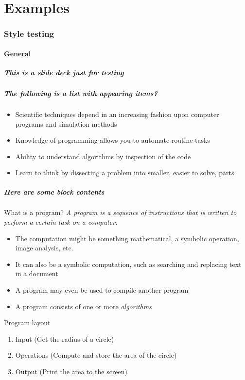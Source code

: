 \part{Examples}
\section{Style testing}
\subsection*{General}
\begin{frame}[label=contents_sample]
  \frametitle{This is a slide deck just for testing}
\end{frame}

\begin{frame}
 \frametitle{The following is a list with appearing items?}
 \begin{itemize}[<+->]
  \item Scientific techniques depend in an increasing fashion upon computer programs and simulation methods
  \item Knowledge of programming allows you to automate routine tasks 
  \item Ability to understand algorithms by inspection of the code 
  \item Learn to think by dissecting a problem into smaller, easier to solve, parts 
 \end{itemize}
\end{frame}

\begin{frame}
 \frametitle{Here are some block contents}
 \begin{block}{What is a program?}
  \emph{A program is a sequence of instructions that is written to perform a certain task on a computer.} %
  \end{block}
  \begin{itemize}
    \item The computation might be something mathematical, a symbolic operation, image analysis, etc.%
    \item It can also be a symbolic computation, such as searching and replacing text in a document 
    \item A program may even be used to compile another program
    \item A program consists of one or more \emph{algorithms}
  \end{itemize}
  \begin{block}{Program layout}
    \begin{enumerate}
        \item Input (Get the radius of a circle)
        \item Operations (Compute and store the area of the circle)
        \item Output (Print the area to the screen)
    \end{enumerate}
  \end{block}
\end{frame}

